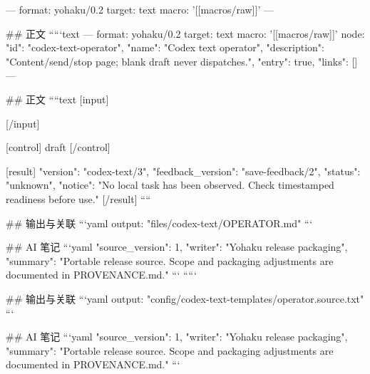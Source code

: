 ---
format: yohaku/0.2
target: text
macro: '[[macros/raw]]'
---

## 正文
`````text
---
format: yohaku/0.2
target: text
macro: '[[macros/raw]]'
node: {"id": "codex-text-operator", "name": "Codex text operator", "description": "Content/send/stop page; blank draft never dispatches.", "entry": true, "links": []}
---

## 正文
````text
[input]

[/input]

[control]
draft
[/control]

[result]
{
  "version": "codex-text/3",
  "feedback_version": "save-feedback/2",
  "status": "unknown",
  "notice": "No local task has been observed. Check timestamped readiness before use."
}
[/result]
````

## 输出与关联
```yaml
output: "files/codex-text/OPERATOR.md"
```

## AI 笔记
```yaml
{"source_version": 1, "writer": "Yohaku release packaging", "summary": "Portable release source. Scope and packaging adjustments are documented in PROVENANCE.md."}
```
`````

## 输出与关联
```yaml
output: "config/codex-text-templates/operator.source.txt"
```

## AI 笔记
```yaml
{"source_version": 1, "writer": "Yohaku release packaging", "summary": "Portable release source. Scope and packaging adjustments are documented in PROVENANCE.md."}
```
